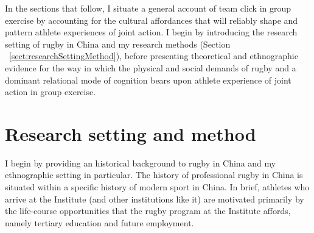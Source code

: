 \begin{CJK}{UTF8}{gbsn}
In the sections that follow, I situate a general account of team click in group exercise by accounting for the cultural affordances that will reliably shape and pattern athlete experiences of joint action.  I begin by introducing the research setting of rugby in China and my research methods (Section ~\ref{sect:researchSettingMethod}), before presenting theoretical and ethnographic evidence for the way in which the physical and social demands of rugby and a dominant relational mode of cognition bears upon athlete experience of joint action in group exercise.










\section{Research setting and method\label{sect:researchSettingMethod}}
I begin by providing an historical background to rugby in China and my ethnographic setting in particular.  The history of professional rugby in China is situated within a specific history of modern sport in China.  In brief, athletes who arrive at the Institute (and other institutions like it) are motivated primarily by the life-course opportunities that the rugby program at the Institute affords, namely tertiary education and future employment.


\end{CJK}
